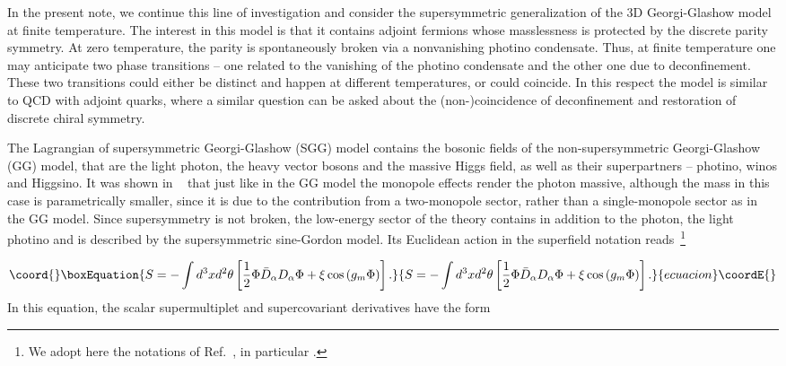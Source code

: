 \documentclass[a4paper,12pt]{article}
\begin{document}
In the present note, we continue this line of investigation and consider
the supersymmetric generalization of the 3D Georgi-Glashow model
at finite temperature. The interest in this model is that it
contains adjoint fermions whose masslessness is protected by the
discrete parity symmetry. At zero temperature, the parity is
spontaneously broken via a nonvanishing photino condensate. Thus,
at finite temperature one may anticipate two phase transitions --
one related to the vanishing of the photino condensate and the
other one due to deconfinement. These two transitions could either
be distinct and happen at different temperatures, or could
coincide. In this respect the model is similar to QCD with adjoint
quarks, where a similar question can be asked about the
(non-)coincidence of deconfinement and restoration of discrete
chiral symmetry.



The Lagrangian of supersymmetric Georgi-Glashow (SGG) model
contains the bosonic fields of the non-supersymmetric
Georgi-Glashow (GG) model, that are the light photon, the heavy
\coordHE{} vector bosons and the massive Higgs field, as well as
their superpartners -- photino, winos and Higgsino. It was shown
in ~\cite{ahw} that just like in the GG model the monopole effects
render the photon massive, although the mass in this case is
parametrically smaller, since it is due to the contribution from a
two-monopole sector, rather than a single-monopole sector as in
the GG model. Since supersymmetry is not broken, the low-energy
sector of the theory contains in addition to the photon, the light
photino and is described by the supersymmetric sine-Gordon model.
Its Euclidean action in the superfield notation reads~\footnote{We
adopt here the notations of Ref.~\cite{MZ}, in particular \coordHE{}.}


\begin{equation}\coord{}\boxEquation{
\label{0}
S=-\int d^3xd^2\theta\left[\frac12\Phi\bar D_\alpha D_\alpha\Phi+\xi
\cos\left(g_m\Phi\right)\right].
}{
S=-\int d^3xd^2\theta\left[\frac12\Phi\bar D_\alpha D_\alpha\Phi+\xi
\cos\left(g_m\Phi\right)\right].
}{ecuacion}\coordE{}\end{equation}
In this equation, the scalar supermultiplet and supercovariant
derivatives have the form
\end{document}
